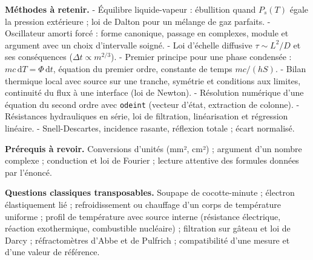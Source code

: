 \documentclass[11pt,a4paper]{article}
\begin{document}
\textbf{Méthodes à retenir.}
- Équilibre liquide-vapeur : ébullition quand \(P_s(T)\) égale la pression extérieure ; loi de Dalton pour un mélange de gaz parfaits.
- Oscillateur amorti forcé : forme canonique, passage en complexes, module et argument avec un choix d'intervalle soigné.
- Loi d'échelle diffusive \(\tau\sim L^2/D\) et ses conséquences (\(\Delta t\propto m^{2/3}\)).
- Premier principe pour une phase condensée : \(mc\,\mathrm dT=\Phi\,\mathrm dt\), équation du premier ordre, constante de temps \(mc/(hS)\).
- Bilan thermique local avec source sur une tranche, symétrie et conditions aux limites, continuité du flux à une interface (loi de Newton).
- Résolution numérique d'une équation du second ordre avec \texttt{odeint} (vecteur d'état, extraction de colonne).
- Résistances hydrauliques en série, loi de filtration, linéarisation et régression linéaire.
- Snell-Descartes, incidence rasante, réflexion totale ; écart normalisé.

\textbf{Prérequis à revoir.} Conversions d'unités (mm², cm²) ; argument d'un nombre complexe ; conduction et loi de Fourier ; lecture attentive des formules données par l'énoncé.

\textbf{Questions classiques transposables.} Soupape de cocotte-minute ; électron élastiquement lié ; refroidissement ou chauffage d'un corps de température uniforme ; profil de température avec source interne (résistance électrique, réaction exothermique, combustible nucléaire) ; filtration sur gâteau et loi de Darcy ; réfractomètres d'Abbe et de Pulfrich ; compatibilité d'une mesure et d'une valeur de référence.
\end{document}
